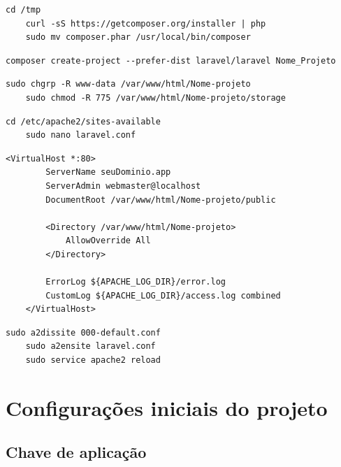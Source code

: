 \documentclass[
12pt,				%
openany,			%
twoside,			%
a4paper,			%
english,			%
french,				%
spanish,			%
brazil,				%
]{abntex2}
\begin{document}
\begin{lstlisting}[style=bash,caption={Instalando o Composer (gerenciador de pacotes PHP)}]
    cd /tmp
    curl -sS https://getcomposer.org/installer | php
    sudo mv composer.phar /usr/local/bin/composer
\end{lstlisting}

\begin{lstlisting}[style=bash,caption={Criando novo projeto Laravel}]
    composer create-project --prefer-dist laravel/laravel Nome_Projeto
\end{lstlisting}

\begin{lstlisting}[style=bash,caption={Permissões de acesso no apache}]
    sudo chgrp -R www-data /var/www/html/Nome-projeto
    sudo chmod -R 775 /var/www/html/Nome-projeto/storage
\end{lstlisting}

\begin{lstlisting}[style=bash,caption={Arquivo de configuração do projeto}]
    cd /etc/apache2/sites-available
    sudo nano laravel.conf
\end{lstlisting}

\begin{lstlisting}[style=bash,caption={\textit{laravel.conf}}]
    <VirtualHost *:80>
        ServerName seuDominio.app
        ServerAdmin webmaster@localhost
        DocumentRoot /var/www/html/Nome-projeto/public

        <Directory /var/www/html/Nome-projeto>
            AllowOverride All
        </Directory>

        ErrorLog ${APACHE_LOG_DIR}/error.log
        CustomLog ${APACHE_LOG_DIR}/access.log combined
    </VirtualHost>
\end{lstlisting}

\begin{lstlisting}[style=bash,caption={Desabilitando virtualhost padrão e habilitando o novo}]
    sudo a2dissite 000-default.conf
    sudo a2ensite laravel.conf
    sudo service apache2 reload
\end{lstlisting}

\section{Configurações iniciais do projeto}

\subsection{Chave de aplicação}
\end{document}
